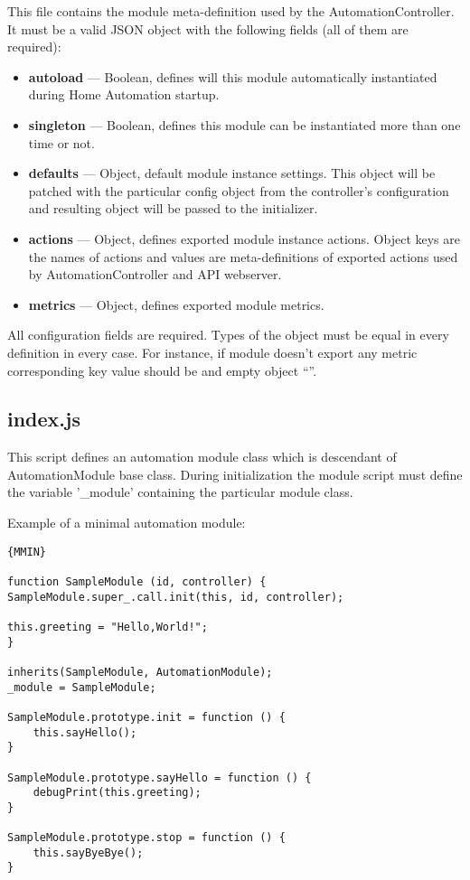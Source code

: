 This file contains the module meta-definition used by the AutomationController. It must 
be a valid JSON object with the following fields (all of them are required):
\begin{itemize}
\item \textbf{autoload} — Boolean, defines will this module automatically instantiated during Home Automation startup.
\item \textbf{singleton} — Boolean, defines this module can be instantiated more than one time or not.
\item \textbf{defaults} — Object, default module instance settings. This object will be patched with the particular 
config object from the controller's configuration and resulting object will be passed to the initializer.
\item \textbf{actions} — Object, defines exported module instance actions. Object keys 
are the names of actions and  values are meta-definitions of exported actions used by 
AutomationController and API webserver.
\item \textbf{metrics} — Object, defines exported module metrics.
\end{itemize}
All configuration fields are required. Types of the object must be equal in every definition in every case. For instance, if module doesn't export any metric corresponding key value should be and empty object “{}”.

\subsection{index.js}
 
This script defines an automation module class which is descendant of AutomationModule base class.
During initialization the module script must define the variable '\_module' containing the particular module class.


Example of a minimal automation module:

\begin{lstlisting}[caption=Minimal Module]{MMIN}

function SampleModule (id, controller) {
SampleModule.super_.call.init(this, id, controller);

this.greeting = "Hello,World!";
}

inherits(SampleModule, AutomationModule);
_module = SampleModule;

SampleModule.prototype.init = function () {
    this.sayHello();
}

SampleModule.prototype.sayHello = function () {
    debugPrint(this.greeting);
} 

SampleModule.prototype.stop = function () {
    this.sayByeBye();
}    

\end{lstlisting} 
 
